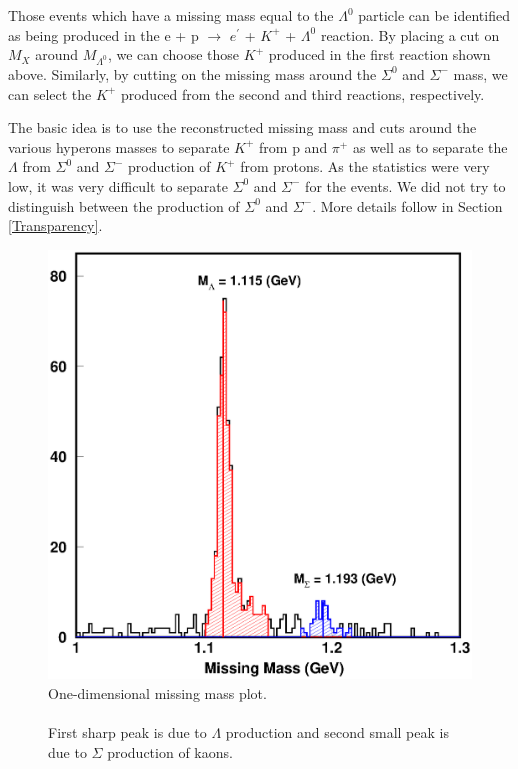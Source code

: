Those events which have a missing mass equal to the  $\Lambda^0$ particle can be identified as being produced in the e + p $\rightarrow$ $e^\prime$ + $K^+$ + $\Lambda^0$ reaction. By placing a cut on $M_X$ around $M_{\Lambda^0}$, we can choose those $K^+$ produced in the first reaction shown above. Similarly, by cutting on the missing mass around the $\Sigma^0$ and $\Sigma^-$ mass, we can select the $K^+$ produced from the second and third reactions, respectively.

The basic idea is to use the reconstructed missing mass and cuts around the various hyperons masses to separate $K^+$ from p and $\pi^+$ as well as to separate the $\Lambda$ from $\Sigma^0$ and $\Sigma^-$ production of $K^+$ from protons. As the statistics were very low, it was very difficult to separate $\Sigma^0$ and $\Sigma^-$ for the events. We did not try to distinguish between the production of $\Sigma^0$ and $\Sigma^-$. More details follow in Section \ref{Transparency}.

\begin{figure}[!tbp]
  \centering
  \includegraphics[width=0.8\columnwidth]{missmass1}
  \caption[One-dimensional missing mass plot.]{\label{fig:missmass1}One-dimensional missing mass plot.\\\\ First sharp peak is due to $\Lambda$ production and second small peak is due to $\Sigma$ production of kaons.}
\end{figure}

